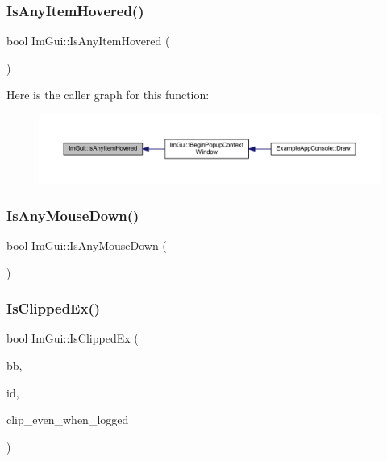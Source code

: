 \subsubsection{\texorpdfstring{Is\+Any\+Item\+Hovered()}{IsAnyItemHovered()}}
{\footnotesize\ttfamily bool Im\+Gui\+::\+Is\+Any\+Item\+Hovered (\begin{DoxyParamCaption}{ }\end{DoxyParamCaption})}

Here is the caller graph for this function\+:
\nopagebreak
\begin{figure}[H]
\begin{center}
\leavevmode
\includegraphics[width=350pt]{namespace_im_gui_a0512146617bb55e24ebcfbe3ce6553d5_icgraph}
\end{center}
\end{figure}
\mbox{\label{namespace_im_gui_a0ce3f28b6b09f031e12e7a81708c043a}} 
\subsubsection{\texorpdfstring{Is\+Any\+Mouse\+Down()}{IsAnyMouseDown()}}
{\footnotesize\ttfamily bool Im\+Gui\+::\+Is\+Any\+Mouse\+Down (\begin{DoxyParamCaption}{ }\end{DoxyParamCaption})}

\mbox{\label{namespace_im_gui_a8674467ae34d04bc99df1f7f98f47407}} 
\subsubsection{\texorpdfstring{Is\+Clipped\+Ex()}{IsClippedEx()}}
{\footnotesize\ttfamily bool Im\+Gui\+::\+Is\+Clipped\+Ex (\begin{DoxyParamCaption}\item[{const \mbox{\hyperlink{struct_im_rect}{Im\+Rect}} \&}]{bb,  }\item[{\mbox{\hyperlink{imgui_8h_a1785c9b6f4e16406764a85f32582236f}{Im\+Gui\+ID}}}]{id,  }\item[{bool}]{clip\+\_\+even\+\_\+when\+\_\+logged }\end{DoxyParamCaption})}

